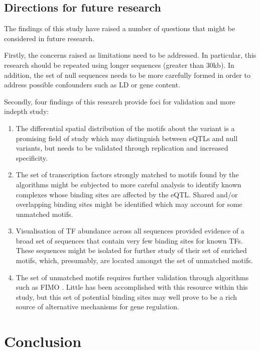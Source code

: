 \documentclass[12pt]{article}
\begin{document}
\subsection{Directions for future research}
The findings of this study have raised a number of questions that might be considered in future research. 

Firstly, the concerns raised as limitations need to be addressed. In particular, this research should be repeated using longer sequences (greater than 30kb). In addition, the set of null sequences needs to be more carefully formed in order to address possible confounders such as LD or gene content.

Secondly, four findings of this research provide foci for validation and more indepth study:
\begin{enumerate}
\item The differential spatial distribution of the motifs about the variant is a promising field of study which may distinguish between eQTLs and null variants, but needs to be validated through replication and increased specificity.

\item The set of transcription factors strongly matched to motifs found by the algorithms might be subjected to more careful analysis to identify known complexes whose binding sites are affected by the eQTL. Shared and/or overlapping binding sites might be identified which may account for some unmatched motifs.

\item Visualisation of TF abundance across all sequences provided evidence of a broad set of sequences that contain very few binding sites for known TFs. These sequences might be isolated for further study of their set of enriched motifs, which, presumably, are located amongst the set of unmatched motifs.

\item The set of unmatched motifs requires further validation through algorithms such as FIMO \citep{Grant2011}. Little has been accomplished with this resource within this study, but this set of potential binding sites may well prove to be a rich source of alternative mechanisms for gene regulation. 
\end{enumerate}

\section{Conclusion}
\end{document}
